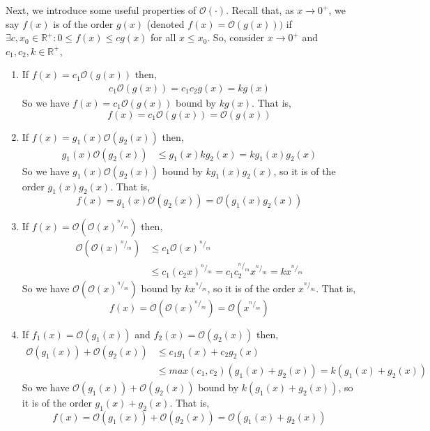 \documentclass[12pt]{article}
\begin{document}
\noindent Next, we introduce some useful properties of $\mathcal O(\cdot)$. Recall that, as $x \longrightarrow 0^+$, we say $f(x)$ is of the order $g(x)$ (denoted $f(x) = \mathcal O(g(x)))$ if $\exists c,x_0 \in \mathbb{R}^{+}: 0 \leq f(x) \leq cg(x)$ for all $x \leq x_0$. So, consider $x \longrightarrow 0^+$ and $c_1, c_2, k \in \mathbb{R^+}$,
\begin{enumerate}
\item If $f(x) = c_1\mathcal O(g(x))$ then, %
\begin{align*}
	c_1\mathcal O(g(x)) = c_1c_2g(x) = kg(x) 
\end{align*}
So we have $f(x) = c_1\mathcal O(g(x))$ bound by $kg(x)$. That is,
\begin{equation*}
	f(x) = c_1\mathcal O(g(x)) = \mathcal O(g(x))
\end{equation*}

\item If $f(x) = g_1(x)\mathcal O(g_2(x))$ then, %
 \begin{align*} 
	g_1(x)\mathcal O(g_2(x)) & \leq g_1(x)kg_2(x) = kg_1(x)g_2(x)
\end{align*} 
So we have $g_1(x)\mathcal O(g_2(x))$ bound by $kg_1(x)g_2(x)$, so it is of the order $g_1(x)g_2(x)$. That is, 
\begin{equation*}
	f(x) = g_1(x)\mathcal O(g_2(x)) = \mathcal O(g_1(x)g_2(x))
\end{equation*}

\item If $f(x) = \mathcal O(\mathcal O(x)^{^n/_m})$ then, %
\begin{align*}
	\mathcal O (\mathcal O(x)^{^n/_m}) & \leq c_1\mathcal O(x)^{^n/_m} \\
	& \leq c_1(c_2x)^{^n/_m} = c_1c_2^{^n/_m}x^{^n/_m} = kx^{^n/_m}
\end{align*}
So we have $\mathcal O(\mathcal O(x)^{^n/_m})$ bound by $kx^{^n/_m}$, so it is of the order $x^{^n/_m}$. That is,
\begin{equation*}
	f(x) = \mathcal O(\mathcal O(x)^{^n/_m}) = \mathcal O(x^{^n/_m})
\end{equation*}

\item If $f_1(x) = \mathcal O(g_1(x))$ and $f_2(x) = \mathcal O(g_2(x))$ then,  %
\begin{align*}
	\mathcal O(g_1(x)) + \mathcal O(g_2(x)) &\leq c_1g_1(x) + c_2g_2(x) \\
	&\leq max(c_1,c_2)(g_1(x) + g_2(x)) = k(g_1(x) + g_2(x))
\end{align*}
So we have $\mathcal O(g_1(x)) + \mathcal O(g_2(x)) $ bound by $k(g_1(x) + g_2(x))$, so it is of the order $g_1(x) + g_2(x)$. That is, \\
\begin{equation*}
	f(x) = \mathcal O(g_1(x)) + \mathcal O(g_2(x)) = \mathcal O(g_1(x) + g_2(x))
\end{equation*} \\
\end{enumerate} 
\end{document}
